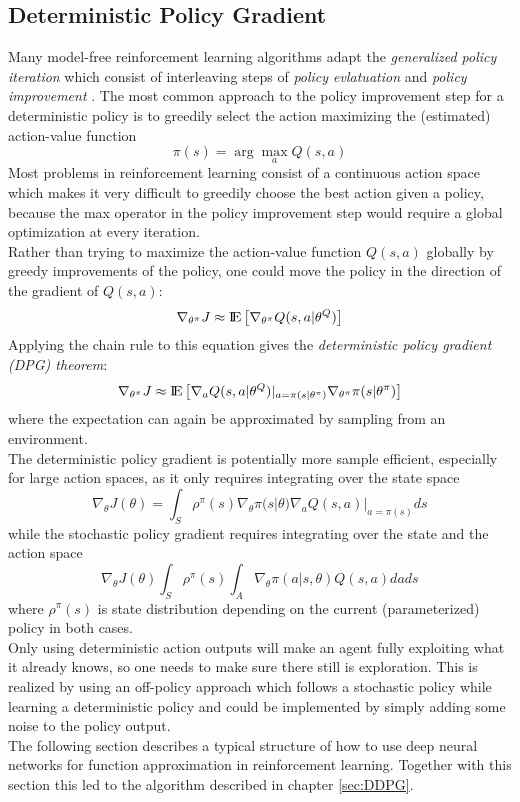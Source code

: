 \subsection{Deterministic Policy Gradient}
\label{sec:DPG}
Many model-free reinforcement learning algorithms adapt the \textit{generalized policy iteration} which consist of interleaving steps of \textit{policy evlatuation} and \textit{policy improvement} \citep{sutton2018reinforcement}. The most common approach to the policy improvement step for a deterministic policy is to greedily select the action maximizing the (estimated) action-value function
\[
\pi(s) = \arg\max_a Q(s, a)
\]
Most problems in reinforcement learning consist of a continuous action space which makes it very difficult to greedily choose the best action given a policy, because the max operator in the policy improvement step
would require a global optimization at every iteration.\\ 
Rather than trying to maximize the action-value function $Q(s,a)$ globally by greedy improvements of the policy, one could move the policy in the direction of the gradient of $Q(s,a)$:
\[
\nabla_{\theta^\pi}J\approx {\rm I\!E}\left[\nabla_{\theta^\pi}Q(s,a|\theta^Q)\right]
\]
Applying the chain rule to this equation gives the \textit{deterministic policy gradient (DPG) theorem}:
\begin{align*}
\nabla_{\theta^\pi}J\approx {\rm I\!E}\left[\nabla_aQ(s,a|\theta^Q)|_{a=\pi(s|\theta^\pi)} \nabla_{\theta^\pi}\pi(s|\theta^\pi)\right]
\end{align*}
where the expectation can again be approximated by sampling from an environment.\\
The deterministic policy gradient is potentially more sample efficient, especially for large action spaces, as it only requires integrating over the state space
\[
\nabla_{\theta}J(\theta) = \int_{\mathit{S}}\rho^\pi(s) \nabla_{\theta}\pi(s|\theta)\nabla_a Q(s,a)|_{a=\pi(s)} ds
\]
while the stochastic policy gradient \citep{sutton2018reinforcement} requires integrating over the state and the action space
\[
\nabla_{\theta}J(\theta)\int_{\mathit{S}}\rho^\pi(s)\int_{\mathit{A}}\nabla_{\theta}\pi(a|s,\theta)Q(s, a) da ds
\]
where $\rho^\pi(s)$ is state distribution depending on the current (parameterized) policy in both cases.\\
Only using deterministic action outputs will make an agent fully exploiting what it already knows, so one needs to make sure there still is exploration. This is realized by using an off-policy approach which follows a stochastic policy while learning a deterministic policy and could be implemented by simply adding some noise to the policy output.\\
The following section describes a typical structure of how to use deep neural networks for function approximation in reinforcement learning. Together with this section this led to the algorithm described in chapter \ref{sec:DDPG}.

